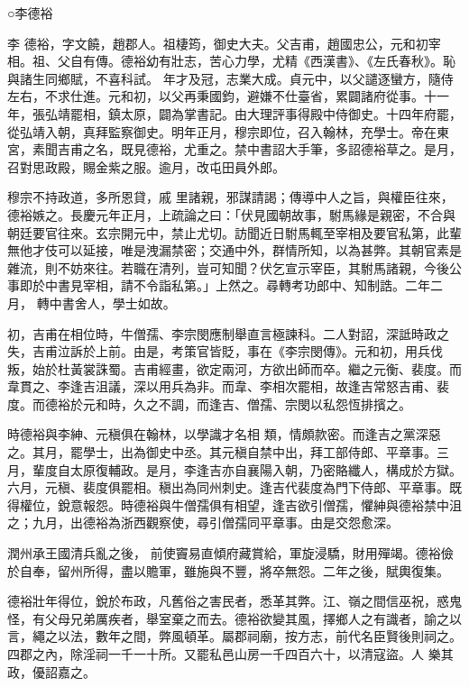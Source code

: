 
\begin{pinyinscope}

 ○李德裕



 李
 德裕，字文饒，趙郡人。祖棲筠，御史大夫。父吉甫，趙國忠公，元和初宰相。祖、父自有傳。德裕幼有壯志，苦心力學，尤精《西漢書》、《左氏春秋》。恥與諸生同鄉賦，不喜科試。
 年才及冠，志業大成。貞元中，以父譴逐蠻方，隨侍左右，不求仕進。元和初，以父再秉國鈞，避嫌不仕臺省，累闢諸府從事。十一年，張弘靖罷相，鎮太原，闢為掌書記。由大理評事得殿中侍御史。十四年府罷，從弘靖入朝，真拜監察御史。明年正月，穆宗即位，召入翰林，充學士。帝在東宮，素聞吉甫之名，既見德裕，尤重之。禁中書詔大手筆，多詔德裕草之。是月，召對思政殿，賜金紫之服。逾月，改屯田員外郎。



 穆宗不持政道，多所恩貸，戚
 里諸親，邪謀請謁；傳導中人之旨，與權臣往來，德裕嫉之。長慶元年正月，上疏論之曰：「伏見國朝故事，駙馬緣是親密，不合與朝廷要官往來。玄宗開元中，禁止尤切。訪聞近日駙馬輒至宰相及要官私第，此輩無他才伎可以延接，唯是洩漏禁密；交通中外，群情所知，以為甚弊。其朝官素是雜流，則不妨來往。若職在清列，豈可知聞？伏乞宣示宰臣，其駙馬諸親，今後公事即於中書見宰相，請不令詣私第。」上然之。尋轉考功郎中、知制誥。二年二月，
 轉中書舍人，學士如故。



 初，吉甫在相位時，牛僧孺、李宗閔應制舉直言極諫科。二人對詔，深詆時政之失，吉甫泣訴於上前。由是，考策官皆貶，事在《李宗閔傳》。元和初，用兵伐叛，始於杜黃裳誅蜀。吉甫經畫，欲定兩河，方欲出師而卒。繼之元衡、裴度。而韋貫之、李逢吉沮議，深以用兵為非。而韋、李相次罷相，故逢吉常怒吉甫、裴度。而德裕於元和時，久之不調，而逢吉、僧孺、宗閔以私怨恆排擯之。



 時德裕與李紳、元稹俱在翰林，以學識才名相
 類，情頗款密。而逢吉之黨深惡之。其月，罷學士，出為御史中丞。其元稹自禁中出，拜工部侍郎、平章事。三月，輩度自太原復輔政。是月，李逢吉亦自襄陽入朝，乃密賂纖人，構成於方獄。六月，元稹、裴度俱罷相。稹出為同州刺史。逢吉代裴度為門下侍郎、平章事。既得權位，銳意報怨。時德裕與牛僧孺俱有相望，逢吉欲引僧孺，懼紳與德裕禁中沮之；九月，出德裕為浙西觀察使，尋引僧孺同平章事。由是交怨愈深。



 潤州承王國清兵亂之後，
 前使竇易直傾府藏賞給，軍旋浸驕，財用殫竭。德裕儉於自奉，留州所得，盡以贍軍，雖施與不豐，將卒無怨。二年之後，賦輿復集。



 德裕壯年得位，銳於布政，凡舊俗之害民者，悉革其弊。江、嶺之間信巫祝，惑鬼怪，有父母兄弟厲疾者，舉室棄之而去。德裕欲變其風，擇鄉人之有識者，諭之以言，繩之以法，數年之間，弊風頓革。屬郡祠廟，按方志，前代名臣賢後則祠之。四郡之內，除淫祠一千一十所。又罷私邑山房一千四百六十，以清寇盜。人
 樂其政，優詔嘉之。




\end{pinyinscope}
